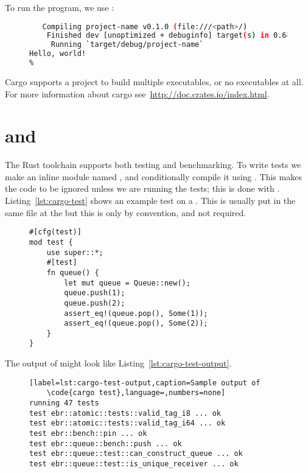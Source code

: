 \documentclass[a4paper,twoside]{report}
\begin{document}
\begin{appendices}
  To run the program, we use \cargo{}:
  \begin{figure}[ht]
  \begin{lstlisting}[language=Bash,numbers=none]
% cargo run
   Compiling project-name v0.1.0 (file:///<path>/)
    Finished dev [unoptimized + debuginfo] target(s) in 0.68 secs
     Running `target/debug/project-name`
Hello, world!
%
  \end{lstlisting}
\end{figure}

  Cargo supports a project to build multiple executables, or no executables at all.
  For more information about cargo see~\url{http://doc.crates.io/index.html}.

  \section{\code{\#[test]} and \code{\#[bench]}}
  The Rust toolchain supports both testing and benchmarking. To write tests we
  make an inline module named , and conditionally compile it using
  . This makes the code to be ignored unless we are running
  the tests; this is done with . Listing~\ref{lst:cargo-test}
  shows an example test on a . This is usually put in the same file
  at the  but this is only by convention, and not required.

  \begin{figure}[ht!]
  \begin{lstlisting}[label=lst:cargo-test,caption=An example test in Rust]
#[cfg(test)]
mod test {
    use super::*;
    #[test]
    fn queue() {
        let mut queue = Queue::new();
        queue.push(1);
        queue.push(2);
        assert_eq!(queue.pop(), Some(1));
        assert_eq!(queue.pop(), Some(2));
    }
}
    \end{lstlisting}
  \end{figure}
  The output of  might look like
  Listing~\ref{lst:cargo-test-output}.
  \begin{figure}[ht!]
    \begin{lstlisting}[label=lst:cargo-test-output,caption=Sample output of
    \code{cargo test},language=,numbers=none]
running 47 tests
test ebr::atomic::tests::valid_tag_i8 ... ok
test ebr::atomic::tests::valid_tag_i64 ... ok
test ebr::bench::pin ... ok
test ebr::queue::bench::push ... ok
test ebr::queue::test::can_construct_queue ... ok
test ebr::queue::test::is_unique_receiver ... ok
    \end{lstlisting}
  \end{figure}


\end{appendices}
\end{document}
